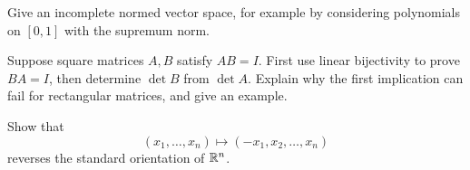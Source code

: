 \begin{exercise}
Give an incomplete normed vector space, for example by considering
polynomials on $[0,1]$ with the supremum norm.
\end{exercise}

\begin{exercise}
Suppose square matrices $A,B$ satisfy $AB=I$. First use linear bijectivity
to prove $BA=I$, then determine $\det B$ from $\det A$. Explain why the
first implication can fail for rectangular matrices, and give an example.
\end{exercise}

\begin{exercise}
Show that
\[
(x_1,\ldots,x_n)\longmapsto(-x_1,x_2,\ldots,x_n)
\]
reverses the standard orientation of $\mathbb{R}^n$.
\end{exercise}


